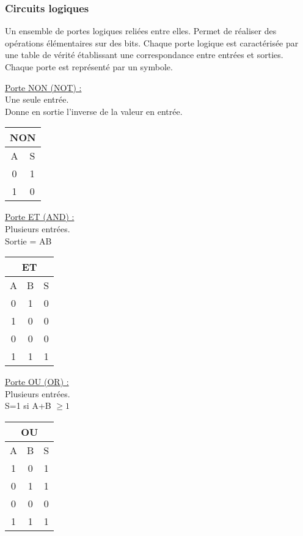 \documentclass[../main.tex]{subfiles}
\begin{document}
\subsubsection{Circuits logiques}
Un ensemble de portes logiques reliées entre elles. Permet de réaliser des opérations élémentaires sur des bits. Chaque porte logique est caractérisée par une table de vérité établissant une correspondance entre entrées et sorties. Chaque porte est représenté par un symbole.\\

\begin{minipage}{.3\textwidth}
    \quad \underline{Porte NON (NOT) :}\\
    Une seule entrée.\\
    Donne en sortie l'inverse de la valeur en entrée. \\
    \centering
    \begin{tabular}{c|c}
        \multicolumn{2}{c}{NON}\\
        \hline
        A & S\\
        \hline
        0 & 1\\
        1 & 0\\            
    \end{tabular}
\end{minipage}
\hfill
\begin{minipage}{.3\textwidth}
    \quad \underline{Porte ET (AND) :}\\
    Plusieurs entrées.\\
    Sortie = AB\\
    \centering
    \begin{tabular}{c|c|c}
        \multicolumn{3}{c}{ET}\\
        \hline
        A & B&S\\
        \hline
        0&1&0\\
        1&0&0\\
        0&0&0\\
        1&1&1\\            
    \end{tabular}
\end{minipage}
\hfill
\begin{minipage}{.3\textwidth}
    \quad \underline{Porte OU (OR) :}\\
    Plusieurs entrées.\\
    S=1 si A+B $\geq 1$ \\
    \centering
    \begin{tabular}{c|c|c}
        \multicolumn{3}{c}{OU}\\
        \hline
        A & B&S\\
        \hline
        1&0&1\\
        0 & 1&1\\
        0&0&0\\
        1 & 1&1\\            
    \end{tabular}
\end{minipage}
\end{document}
